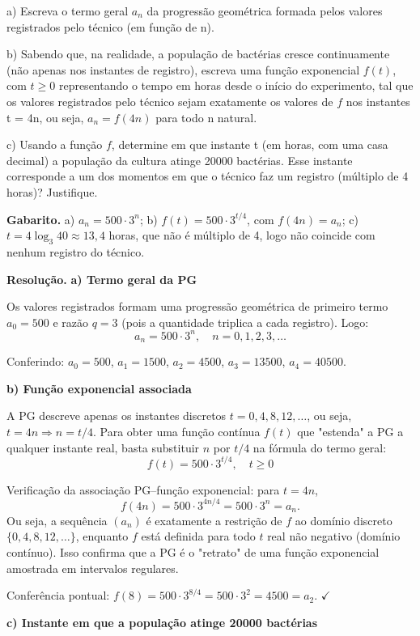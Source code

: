 \documentclass[11pt,a4paper]{article}
\begin{document}
a) Escreva o termo geral $a_n$ da progressão geométrica formada pelos valores registrados pelo técnico (em função de n).

b) Sabendo que, na realidade, a população de bactérias cresce continuamente (não apenas nos instantes de registro), escreva uma função exponencial $f(t)$, com $t \geq 0$ representando o tempo em horas desde o início do experimento, tal que os valores registrados pelo técnico sejam exatamente os valores de $f$ nos instantes t = 4n, ou seja, $a_n = f(4n)$ para todo n natural.

c) Usando a função $f$, determine em que instante t (em horas, com uma casa decimal) a população da cultura atinge 20000 bactérias. Esse instante corresponde a um dos momentos em que o técnico faz um registro (múltiplo de 4 horas)? Justifique.

\textbf{Gabarito.} a) $a_n = 500\cdot 3^n$; b) $f(t) = 500\cdot 3^{t/4}$, com $f(4n)=a_n$; c) $t = 4\log_3 40 \approx 13{,}4$ horas, que não é múltiplo de 4, logo não coincide com nenhum registro do técnico.

\textbf{Resolução.} \textbf{a) Termo geral da PG}

Os valores registrados formam uma progressão geométrica de primeiro termo $a_0 = 500$ e razão $q = 3$ (pois a quantidade triplica a cada registro). Logo:
$$a_n = 500 \cdot 3^n, \quad n = 0,1,2,3,\dots$$

Conferindo: $a_0=500$, $a_1=1500$, $a_2=4500$, $a_3=13500$, $a_4=40500$.

\textbf{b) Função exponencial associada}

A PG descreve apenas os instantes discretos $t=0,4,8,12,\dots$, ou seja, $t = 4n \Rightarrow n = t/4$. Para obter uma função contínua $f(t)$ que "estenda" a PG a qualquer instante real, basta substituir $n$ por $t/4$ na fórmula do termo geral:
$$f(t) = 500 \cdot 3^{t/4}, \quad t \geq 0$$

Verificação da associação PG–função exponencial: para $t = 4n$,
$$f(4n) = 500\cdot 3^{4n/4} = 500\cdot 3^n = a_n.$$
Ou seja, a sequência $(a_n)$ é exatamente a restrição de $f$ ao domínio discreto $\{0,4,8,12,\dots\}$, enquanto $f$ está definida para todo $t$ real não negativo (domínio contínuo). Isso confirma que a PG é o "retrato" de uma função exponencial amostrada em intervalos regulares.

Conferência pontual: $f(8) = 500\cdot 3^{8/4} = 500\cdot 3^2 = 4500 = a_2$. $\checkmark$

\textbf{c) Instante em que a população atinge 20000 bactérias}
\end{document}
